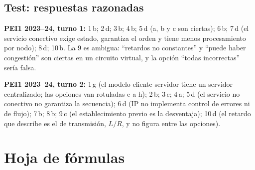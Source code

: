 \documentclass[11pt,a4paper]{article}
\begin{document}
\subsection{Test: respuestas razonadas}

\textbf{PEI1 2023--24, turno 1:} 1\,b; 2\,d; 3\,b; 4\,b; 5\,d (a, b y c son ciertas); 6\,b; 7\,d (el servicio conectivo exige estado, garantiza el orden y tiene menos procesamiento por nodo); 8\,d; 10\,b. La 9 es ambigua: ``retardos no constantes'' y ``puede haber congestión'' son ciertas en un circuito virtual, y la opción ``todas incorrectas'' sería falsa.

\textbf{PEI1 2023--24, turno 2:} 1\,g (el modelo cliente-servidor tiene un servidor centralizado; las opciones van rotuladas e a h); 2\,b; 3\,c; 4\,a; 5\,d (el servicio no conectivo no garantiza la secuencia); 6\,d (IP no implementa control de errores ni de flujo); 7\,b; 8\,b; 9\,c (el establecimiento previo es la desventaja); 10\,d (el retardo que describe es el de transmisión, $L/R$, y no figura entre las opciones).

\newpage
\section{Hoja de fórmulas}
\end{document}
